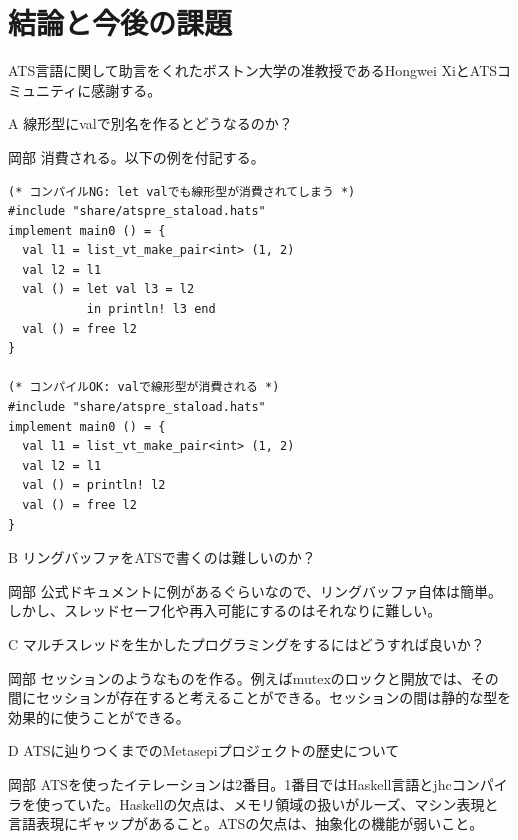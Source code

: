 \documentclass{ipsjprosym}
\begin{document}
\section{結論と今後の課題}

\begin{acknowledgment}
ATS言語に関して助言をくれたボストン大学の准教授であるHongwei XiとATSコミュニティに感謝する。
\end{acknowledgment}

\begin{QandA}
\item[A] 線形型にvalで別名を作るとどうなるのか？
\item[岡部] 消費される。以下の例を付記する。

\begin{verbatim}
(* コンパイルNG: let valでも線形型が消費されてしまう *)
#include "share/atspre_staload.hats"
implement main0 () = {
  val l1 = list_vt_make_pair<int> (1, 2)
  val l2 = l1
  val () = let val l3 = l2
           in println! l3 end
  val () = free l2
}

(* コンパイルOK: valで線形型が消費される *)
#include "share/atspre_staload.hats"
implement main0 () = {
  val l1 = list_vt_make_pair<int> (1, 2)
  val l2 = l1
  val () = println! l2
  val () = free l2
}
\end{verbatim}

\item[B] リングバッファをATSで書くのは難しいのか？
\item[岡部] 公式ドキュメントに例があるぐらいなので、リングバッファ自体は簡単。しかし、スレッドセーフ化や再入可能にするのはそれなりに難しい。
\item[C] マルチスレッドを生かしたプログラミングをするにはどうすれば良いか？
\item[岡部] セッションのようなものを作る。例えばmutexのロックと開放では、その間にセッションが存在すると考えることができる。セッションの間は静的な型を効果的に使うことができる。
\item[D] ATSに辿りつくまでのMetasepiプロジェクトの歴史について
\item[岡部] ATSを使ったイテレーションは2番目。1番目ではHaskell言語とjhcコンパイラを使っていた。Haskellの欠点は、メモリ領域の扱いがルーズ、マシン表現と言語表現にギャップがあること。ATSの欠点は、抽象化の機能が弱いこと。
\end{QandA}



\end{document}
